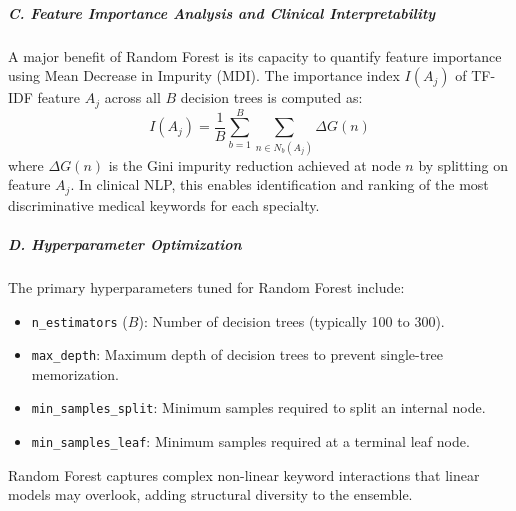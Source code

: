 \subparagraph{C. Feature Importance Analysis and Clinical Interpretability}
A major benefit of Random Forest is its capacity to quantify feature importance using Mean Decrease in Impurity (MDI). The importance index $I(A_j)$ of TF-IDF feature $A_j$ across all $B$ decision trees is computed as:
\begin{equation}
I(A_j) = \frac{1}{B} \sum_{b=1}^{B} \sum_{n \in N_b(A_j)} \Delta G(n)
\end{equation}
where $\Delta G(n)$ is the Gini impurity reduction achieved at node $n$ by splitting on feature $A_j$. In clinical NLP, this enables identification and ranking of the most discriminative medical keywords for each specialty.

\subparagraph{D. Hyperparameter Optimization}
The primary hyperparameters tuned for Random Forest include:
\begin{itemize}
    \item \texttt{n\_estimators} ($B$): Number of decision trees (typically 100 to 300).
    \item \texttt{max\_depth}: Maximum depth of decision trees to prevent single-tree memorization.
    \item \texttt{min\_samples\_split}: Minimum samples required to split an internal node.
    \item \texttt{min\_samples\_leaf}: Minimum samples required at a terminal leaf node.
\end{itemize}
Random Forest captures complex non-linear keyword interactions that linear models may overlook, adding structural diversity to the ensemble.

